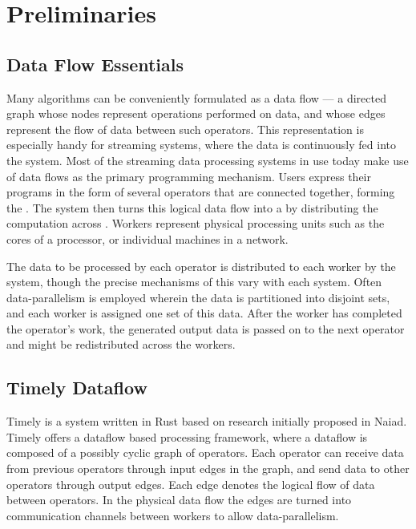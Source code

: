 \section{Preliminaries}
\subsection{Data Flow Essentials}
Many algorithms can be conveniently formulated as a data flow --- a directed graph whose nodes represent operations performed on data, and whose edges represent the flow of data between such operators. This representation is especially handy for streaming systems, where the data is continuously fed into the system. Most of the streaming data processing systems in use today make use of data flows as the primary programming mechanism. Users express their programs in the form of several operators that are connected together, forming the . The system then turns this logical data flow into a  by distributing the computation across . Workers represent physical processing units such as the cores of a processor, or individual machines in a network. \\


The data to be processed by each operator is distributed to each worker by the system, though the precise mechanisms of this vary with each system. Often data-parallelism is employed wherein the data is partitioned into disjoint sets, and each worker is assigned one set of this data. After the worker has completed the operator's work, the generated output data is passed on to the next operator and might be redistributed across the workers.

\subsection{Timely Dataflow}
Timely\cite{timely} is a system written in Rust based on research initially proposed in Naiad\cite{naiad}. Timely offers a dataflow based processing framework, where a dataflow is composed of a possibly cyclic graph of operators. Each operator can receive data from previous operators through input edges in the graph, and send data to other operators through output edges. Each edge denotes the logical flow of data between operators. In the physical data flow the edges are turned into communication channels between workers to allow data-parallelism. \\

